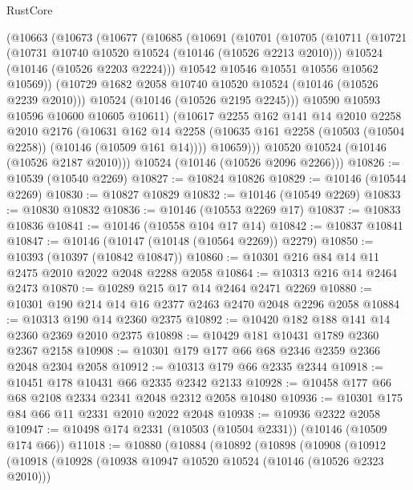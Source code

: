 \begin{lexlean}{RustCore}
\begin{coremodule}
    (@10663
      (@10673
        (@10677
          (@10685
            (@10691
              (@10701
                (@10705
                  (@10711
                    (@10721
                      (@10731 @10740 @10520 @10524 (@10146 (@10526 @2213 @2010)))
                      @10524
                      (@10146 (@10526 @2203 @2224)))
                    @10542
                    @10546
                    @10551
                    @10556
                    @10562
                    @10569))
                (@10729 @1682 @2058 @10740 @10520 @10524 (@10146 (@10526 @2239 @2010)))
                @10524
                (@10146 (@10526 @2195 @2245)))
              @10590
              @10593
              @10596
              @10600
              @10605
              @10611)
            (@10617
              @2255
              @162
              @141
              @14
              @2010
              @2258
              @2010
              @2176
              (@10631
                @162
                @14
                @2258
                (@10635 @161 @2258 (@10503 (@10504 @2258)) (@10146 (@10509 @161 @14))))
              @10659)))
        @10520
        @10524
        (@10146 (@10526 @2187 @2010)))
      @10524
      (@10146 (@10526 @2096 @2266)))
@10826 := @10539 (@10540 @2269)
@10827 := @10824 @10826
@10829 := @10146 (@10544 @2269)
@10830 := @10827 @10829
@10832 := @10146 (@10549 @2269)
@10833 := @10830 @10832
@10836 := @10146 (@10553 @2269 @17)
@10837 := @10833 @10836
@10841 := @10146 (@10558 @104 @17 @14)
@10842 := @10837 @10841
@10847 := @10146 (@10147 (@10148 (@10564 @2269)) @2279)
@10850 := @10393 (@10397 (@10842 @10847))
@10860 := @10301 @216 @84 @14 @11 @2475 @2010 @2022 @2048 @2288 @2058
@10864 := @10313 @216 @14 @2464 @2473
@10870 := @10289 @215 @17 @14 @2464 @2471 @2269
@10880 := @10301 @190 @214 @14 @16 @2377 @2463 @2470 @2048 @2296 @2058
@10884 := @10313 @190 @14 @2360 @2375
@10892 := @10420 @182 @188 @141 @14 @2360 @2369 @2010 @2375
@10898 := @10429 @181 @10431 @1789 @2360 @2367 @2158
@10908 := @10301 @179 @177 @66 @68 @2346 @2359 @2366 @2048 @2304 @2058
@10912 := @10313 @179 @66 @2335 @2344
@10918 := @10451 @178 @10431 @66 @2335 @2342 @2133
@10928 := @10458 @177 @66 @68 @2108 @2334 @2341 @2048 @2312 @2058 @10480
@10936 := @10301 @175 @84 @66 @11 @2331 @2010 @2022 @2048
@10938 := @10936 @2322 @2058
@10947 := @10498 @174 @2331 (@10503 (@10504 @2331)) (@10146 (@10509 @174 @66))
@11018 := @10880
    (@10884
      (@10892
        (@10898
          (@10908
            (@10912
              (@10918
                (@10928
                  (@10938 @10947 @10520 @10524 (@10146 (@10526 @2323 @2010)))

\end{coremodule}
\end{lexlean}
